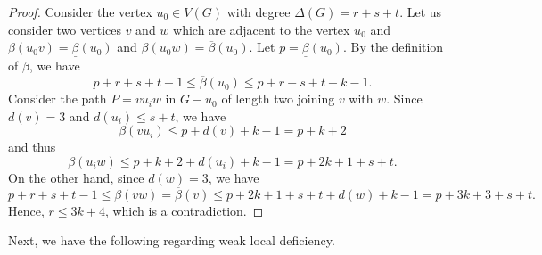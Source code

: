 \documentclass[12pt]{article}
\theoremstyle{plain}
\theoremstyle{definition}
\numberwithin{equation}{section}
\begin{document}
\begin{proof}
Consider the vertex $u_0\in V(G)$ with degree $\Delta(G)=r+s+t$. 
Let us consider two vertices $v$ and $w$ which are adjacent to the vertex $u_0$ and
$\beta(u_0v)=\underline{\beta}(u_0)$ and $\beta(u_0w)=\overline{\beta}(u_0)$. Let $p=\underline{\beta}(u_0)$.
By the definition of $\beta$, we have
$$p+r+s+t-1\leq \overline{\beta}(u_0)\leq p+r+s+t+k-1.$$
Consider the path $P=v u_i w$ in $G-u_0$ of length two joining
$v$ with $w$.
Since $d(v)=3$ and $d(u_i)\leq s+t$, we have
$$\beta(v u_i) \leq p+d(v)+k-1=p+k+2$$ 
and thus
$$\beta(u_i w)\leq p+k+2+ d(u_i)+k-1=p+2k+1+s+t.$$
%
On the other hand, since $d(w)=3$, we have
$$p+r+s+t-1\leq \beta(vw)=\overline{\beta}(v)\leq
p+2k+1+s+t+d(w)+k-1=p+3k+3+s+t.$$
%
Hence, $r\leq 3k+4$, which is a contradiction.
\end{proof}


Next, we have the following regarding weak local deficiency.
\end{document}
